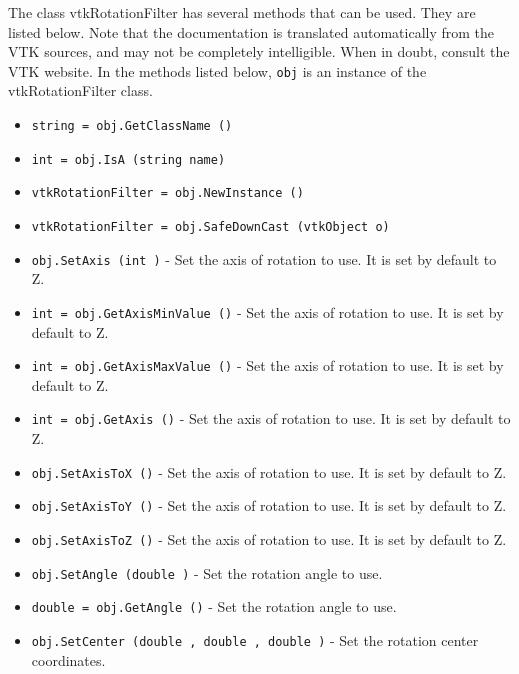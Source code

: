 The class vtkRotationFilter has several methods that can be used.
  They are listed below.
Note that the documentation is translated automatically from the VTK sources,
and may not be completely intelligible.  When in doubt, consult the VTK website.
In the methods listed below, \verb|obj| is an instance of the vtkRotationFilter class.
\begin{itemize}
\item  \verb|string = obj.GetClassName ()|

\item  \verb|int = obj.IsA (string name)|

\item  \verb|vtkRotationFilter = obj.NewInstance ()|

\item  \verb|vtkRotationFilter = obj.SafeDownCast (vtkObject o)|

\item  \verb|obj.SetAxis (int )| -  Set the axis of rotation to use. It is set by default to Z.

\item  \verb|int = obj.GetAxisMinValue ()| -  Set the axis of rotation to use. It is set by default to Z.

\item  \verb|int = obj.GetAxisMaxValue ()| -  Set the axis of rotation to use. It is set by default to Z.

\item  \verb|int = obj.GetAxis ()| -  Set the axis of rotation to use. It is set by default to Z.

\item  \verb|obj.SetAxisToX ()| -  Set the axis of rotation to use. It is set by default to Z.

\item  \verb|obj.SetAxisToY ()| -  Set the axis of rotation to use. It is set by default to Z.

\item  \verb|obj.SetAxisToZ ()| -  Set the axis of rotation to use. It is set by default to Z.

\item  \verb|obj.SetAngle (double )| -  Set the rotation angle to use.

\item  \verb|double = obj.GetAngle ()| -  Set the rotation angle to use.

\item  \verb|obj.SetCenter (double , double , double )| -  Set the rotation center coordinates.


\end{itemize}
